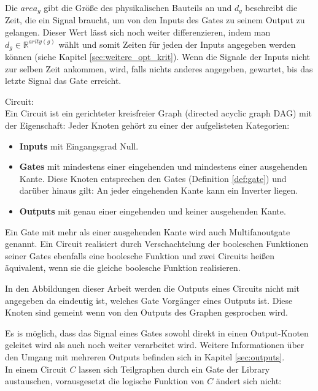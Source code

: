 \documentclass[11pt, a4paper, german]{article}
\begin{document}
Die $area_g$ gibt die Größe des physikalischen Bauteils an und $d_g$ beschreibt die Zeit, die ein Signal braucht, um von den Inputs des Gates zu seinem Output zu gelangen. Dieser Wert lässt sich noch weiter differenzieren, indem man $d_g \in \mathbb{R}^{arity(g)}$ wählt und somit Zeiten für jeden der Inputs angegeben werden können (siehe Kapitel  \ref{sec:weitere_opt_krit}).
Wenn die Signale der Inputs nicht zur selben Zeit ankommen, wird, falls nichts anderes angegeben, gewartet, bis das letzte Signal das Gate erreicht.

\begin{definition}{Circuit:}\\
Ein Circuit ist ein gerichteter kreisfreier Graph (directed acyclic graph DAG) mit der Eigenschaft: Jeder Knoten gehört zu einer der aufgelisteten Kategorien: 
\begin{itemize}
\item {\bf Inputs }mit Eingangsgrad Null.
\item{\bf Gates} mit mindestens einer eingehenden und mindestens einer ausgehenden Kante.
Diese Knoten entsprechen den Gates (Definition \ref{def:gate}) und darüber hinaus gilt: An jeder eingehenden Kante kann ein Inverter liegen.
\item{\bf Outputs} mit genau einer eingehenden und keiner ausgehenden Kante.
\end{itemize}
Ein Gate mit mehr als einer ausgehenden Kante wird auch Multifanoutgate genannt.
Ein Circuit realisiert durch Verschachtelung der booleschen Funktionen seiner Gates ebenfalls eine boolesche Funktion und zwei Circuits heißen äquivalent, wenn sie die gleiche boolesche Funktion realisieren.
\end{definition}

In den Abbildungen dieser Arbeit werden die Outputs eines Circuits nicht mit angegeben da eindeutig ist, welches Gate Vorgänger eines Outputs ist. Diese Knoten sind gemeint wenn von den Outputs des Graphen gesprochen wird. 

Es is möglich, dass das Signal eines Gates sowohl direkt in einen Output-Knoten geleitet wird als auch noch weiter verarbeitet wird. Weitere Informationen über den Umgang mit mehreren Outputs befinden sich in Kapitel \ref{sec:outputs}.\\
In einem Circuit $C$ lassen sich Teilgraphen durch ein Gate der Library austauschen, vorausgesetzt die logische Funktion von $C$ ändert sich nicht: 
\end{document}
